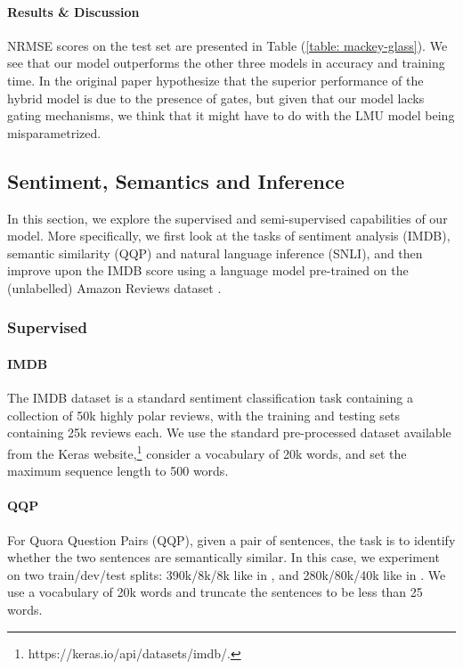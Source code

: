 \documentclass{article}
\begin{document}
\paragraph{Results \& Discussion} NRMSE scores on the test set are presented in Table (\ref{table: mackey-glass}). We see that our model outperforms the other three models in accuracy and training time. In the original paper \citet{voelker2018improving} hypothesize that the superior performance of the hybrid model is due to the presence of gates, but given that our model lacks gating mechanisms, we think that it might have to do with the LMU model being misparametrized. 

\subsection{Sentiment, Semantics and Inference} 

In this section, we explore the supervised and semi-supervised capabilities of our model. More specifically, we first look at the tasks of sentiment analysis (IMDB), semantic similarity (QQP) and natural language inference (SNLI), and then improve upon the IMDB score using a language model pre-trained on the (unlabelled) Amazon Reviews dataset \cite{ni2019justifying}.

\subsubsection*{Supervised}

\paragraph{IMDB} The IMDB dataset \citep{maas2011learning} is a standard sentiment classification task containing a collection of 50k highly polar reviews, with the training and testing sets containing 25k reviews each. We use the standard pre-processed dataset available from the Keras website,\footnote{https://keras.io/api/datasets/imdb/.} consider a vocabulary of 20k words, and set the maximum sequence length to 500 words.

\paragraph{QQP} For Quora Question Pairs (QQP), given a pair of sentences, the task is to identify whether the two sentences are semantically similar. In this case, we experiment on two train/dev/test splits: 390k/8k/8k like in \citet{shen2018baseline},  and 280k/80k/40k like in \citet{sharma2019natural}. We use a vocabulary of 20k words and truncate the sentences to be less than 25 words.
\end{document}

